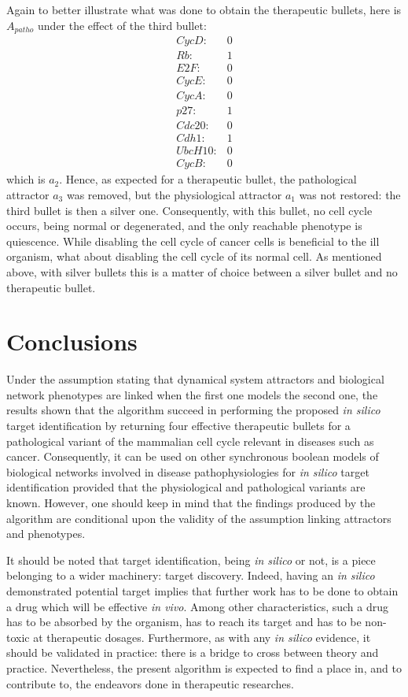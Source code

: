 \documentclass[oneside,a4paper,onecolumn,notitlepage]{article}
\begin{document}
Again to better illustrate what was done to obtain the therapeutic bullets, here is $A_{patho}$ under the effect of the third bullet:
\begin{equation*}
\begin{matrix}
CycD:&0\\
Rb:&1\\
E2F:&0\\
CycE:&0\\
CycA:&0\\
p27:&1\\
Cdc20:&0\\
Cdh1:&1\\
UbcH10:&0\\
CycB:&0
\end{matrix}
\end{equation*}
which is $a_{2}$. Hence, as expected for a therapeutic bullet, the pathological attractor $a_{3}$ was removed, but the physiological attractor $a_{1}$ was not restored: the third bullet is then a silver one. Consequently, with this bullet, no cell cycle occurs, being normal or degenerated, and the only reachable phenotype is quiescence. While disabling the cell cycle of cancer cells is beneficial to the ill organism, what about disabling the cell cycle of its normal cell. As mentioned above, with silver bullets this is a matter of choice between a silver bullet and no therapeutic bullet.

\section{Conclusions}
Under the assumption stating that dynamical system attractors and biological network phenotypes are linked when the first one models the second one, the results shown that the algorithm succeed in performing the proposed \textit{in silico} target identification by returning four effective therapeutic bullets for a pathological variant of the mammalian cell cycle relevant in diseases such as cancer. Consequently, it can be used on other synchronous boolean models of biological networks involved in disease pathophysiologies for \textit{in silico} target identification provided that the physiological and pathological variants are known. However, one should keep in mind that the findings produced by the algorithm are conditional upon the validity of the assumption linking attractors and phenotypes.

It should be noted that target identification, being \textit{in silico} or not, is a piece belonging to a wider machinery: target discovery. Indeed, having an \textit{in silico} demonstrated potential target implies that further work has to be done to obtain a drug which will be effective \textit{in vivo}. Among other characteristics, such a drug has to be absorbed by the organism, has to reach its target and has to be non-toxic at therapeutic dosages. Furthermore, as with any \textit{in silico} evidence, it should be validated in practice: there is a bridge to cross between theory and practice. Nevertheless, the present algorithm is expected to find a place in, and to contribute to, the endeavors done in therapeutic researches.
\end{document}
